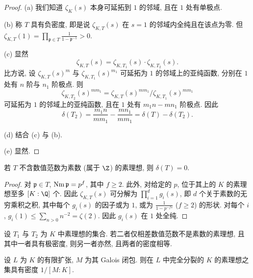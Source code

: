 \begin{proof}
(a) 我们知道 $\zeta_K(s)$ 本身可延拓到 $1$ 的邻域, 且在 $1$ 处有单极点.

(b) 称 $T$ 具有负密度, 即是说 $\zeta_{K,T}(s)$ 在 $s=1$ 的邻域内全纯且在该点为零. 但 $\zeta_{K,T}(1)=\prod_{\mathfrak{p}\in T}\frac{1}{1-\mathfrak{p}^{-1}}>0$.

(c) 显然
\[
\zeta_{K,T}(s)=\zeta_{K,T_{1}}(s)\cdot\zeta_{K,T_{2}}(s).
\]
比方说, 设 $\zeta_{K,T}(s)^{m}$ 与 $\zeta_{K,T_{1}}(s)^{m_{1}}$ 可延拓为 $1$ 的邻域上的亚纯函数, 分别在 $1$ 处有 $n$ 阶与 $n_1$ 阶极点. 则
\[
\zeta_{K,T_{2}}(s)^{mm_{1}}=\zeta_{K,T}(s)^{mm_{1}}/\zeta_{K,T_{1}}(s)^{mm_{1}}
\]
可延拓为 $1$ 的邻域上的亚纯函数, 且在 $1$ 处有 $m_1n-mn_1$ 阶极点. 因此
\[
\delta(T_{2})=\frac{m_{1}n}{mm_{1}}-\frac{mn_{1}}{mm_{1}}=\delta(T)-\delta(T_{2}).
\]

(d) 结合 (c) 与 (b).

(e) 显然.
\end{proof}

\begin{proposition}\label{prop:vi.3.2}
若 $T$ 不含数值范数为素数 (属于 $\Z$) 的素理想, 则 $\delta(T)=0$.
\end{proposition}

\begin{proof}
对 $\mathfrak{p}\in T$, $\operatorname{Nm}\mathfrak{p}=p^{f}$, 其中 $f\ge2$. 此外, 对给定的 $p$, 位于其上的 $K$ 的素理想至多 $[K:\Q]$ 个. 因此 $\zeta_{K,T}(s)$ 可分解为 $\prod_{i=1}^{d}g_{i}(s)$, 即 $d$ 个关于素数的无穷乘积之积, 其中每个 $g_i(s)$ 的因子或为 $1$, 或为 $\frac{1}{1-p^{-fs}}$ ($f\ge2$) 的形状. 对每个 $i$, $g_{i}(1)\le\sum_{n>0}n^{-2}=\zeta(2)$. 因此 $g_i(s)$ 在 $1$ 处全纯.
\end{proof}

\begin{corollary}\label{cor:vi.3.3}
设 $T_1$ 与 $T_2$ 为 $K$ 中素理想的集合. 若二者仅相差数值范数不是素数的素理想, 且其中一者具有极密度, 则另一者亦然, 且两者的密度相等.
\end{corollary}

\begin{theorem}\label{thm:vi.3.4}
设 $L$ 为 $K$ 的有限扩张, $M$ 为其 Galois 闭包. 则在 $L$ 中完全分裂的 $K$ 的素理想之集具有密度 $1/[M:K]$.
\end{theorem}

